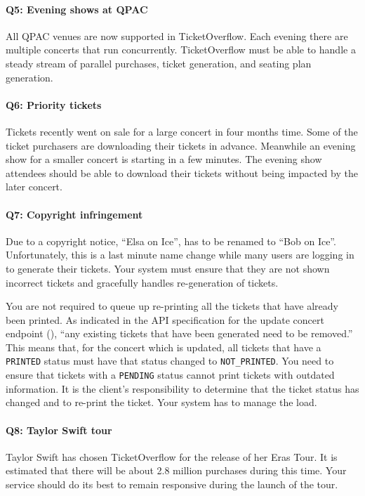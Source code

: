 \documentclass{csse4400}
\begin{document}
\paragraph{Q5: Evening shows at QPAC}
All QPAC venues are now supported in TicketOverflow.
Each evening there are multiple concerts that run concurrently.
TicketOverflow must be able to handle a steady stream of parallel purchases, ticket generation, and seating plan generation.

\paragraph{Q6: Priority tickets}
Tickets recently went on sale for a large concert in four months time.
Some of the ticket purchasers are downloading their tickets in advance.
Meanwhile an evening show for a smaller concert is starting in a few minutes.
The evening show attendees should be able to download their tickets without being impacted by the later concert.

\paragraph{Q7: Copyright infringement}
Due to a copyright notice, ``Elsa on Ice'', has to be renamed to ``Bob on Ice''.
Unfortunately, this is a last minute name change while many users are logging in to generate their tickets.
Your system must ensure that they are not shown incorrect tickets and gracefully handles re-generation of tickets.

You are not required to queue up re-printing all the tickets that have already been printed.
As indicated in the API specification for the update concert endpoint
(),
``any existing tickets that have been generated need to be removed.''
This means that, for the concert which is updated, all tickets that have a \texttt{PRINTED}
status must have that status changed to \texttt{NOT\_PRINTED}.
You need to ensure that tickets with a \texttt{PENDING} status cannot print tickets with outdated information.
It is the client's responsibility to determine that the ticket status has changed and to re-print the ticket.
Your system has to manage the load.

\paragraph{Q8: Taylor Swift tour}
Taylor Swift has chosen TicketOverflow for the release of her Eras Tour.
It is estimated that there will be about 2.8 million purchases during this time.
Your service should do its best to remain responsive during the launch of the tour.
\end{document}

